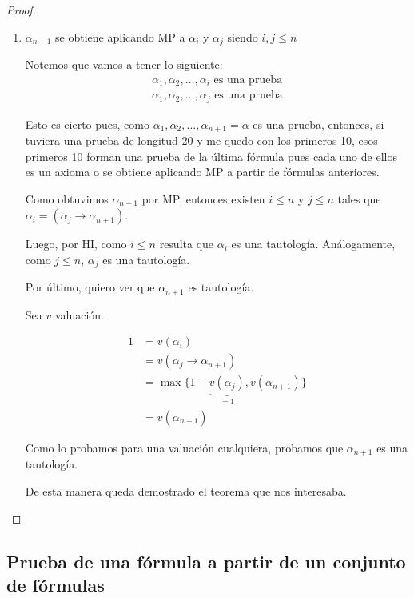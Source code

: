 \begin{proof}
\begin{enumerate}
        \item $\alpha_{n+1}$ se obtiene aplicando MP a $\alpha_i$ y $\alpha_j$
            siendo $i, j \leq n$

            Notemos que vamos a tener lo siguiente:
            \begin{gather*}
                \alpha_1, \alpha_2, \dotsc, \alpha_i \text{ es una prueba}\\
                \alpha_1, \alpha_2, \dotsc, \alpha_j \text{ es una prueba}
            \end{gather*}

            Esto es cierto pues, como 
            $\alpha_1, \alpha_2, \dotsc, \alpha_{n+1}=\alpha$ es una
            prueba, entonces, si tuviera una prueba de longitud 20 y me
            quedo con los primeros 10, esos primeros 10 forman una prueba de
            la última fórmula pues cada uno de ellos es un axioma o se obtiene
            aplicando MP a partir de fórmulas anteriores.

            Como obtuvimos $\alpha_{n+1}$ por MP, entonces existen
            $i \leq n$
            y
            $j \leq n$
            tales que
            $\alpha_i = (\alpha_j \to \alpha_{n+1})$.

            Luego, por HI, como $i \leq n$ resulta que
            $\alpha_i$ es una tautología.
            Análogamente, como $j \leq n$, $\alpha_j$ es una tautología.

            Por último, quiero ver que $\alpha_{n+1}$ es tautología.

            Sea $v$ valuación.

            \begin{align*}
                1 &= v(\alpha_i) \\
                  &= v(\alpha_j \to \alpha_{n+1}) \\
                  &= \max \{ 1- \underbrace{v(\alpha_j)}_{=1}, 
                  v(\alpha_{n+1}) \} \\
                  &= v(\alpha_{n+1})
            \end{align*}

            Como lo probamos para una valuación cualquiera, probamos que
            $\alpha_{n+1}$ es una tautología.

            De esta manera queda demostrado el teorema que nos interesaba.
    \end{enumerate}
\end{proof}


\subsection{Prueba de una fórmula a partir de un conjunto de fórmulas}
 
